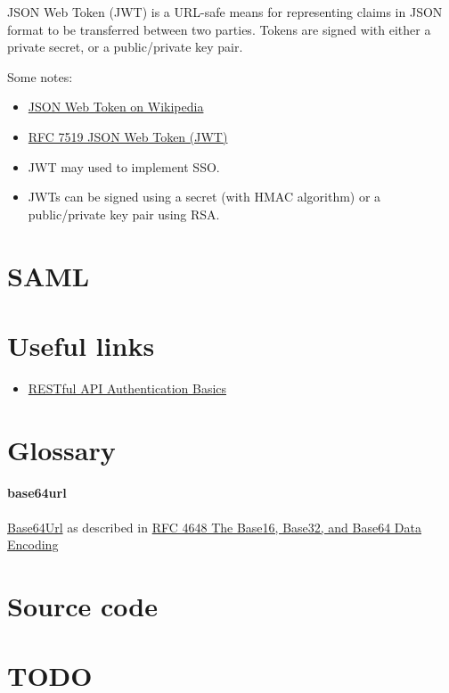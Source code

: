 \documentclass{article}
\begin{document}
JSON Web Token (JWT) is a URL-safe means for representing
claims in JSON format to be transferred between two parties.
Tokens are signed with either a private secret, or a public/private
key pair.

Some notes:

\begin{itemize}
  \item \href{https://en.wikipedia.org/wiki/JSON_Web_Token}{%
     JSON Web Token on Wikipedia}
  \item \href{https://tools.ietf.org/html/rfc7519}{%
     RFC 7519 JSON Web Token (JWT)}
 \item JWT may used to implement SSO.
 \item JWTs can be signed using a secret (with HMAC algorithm) or a
   public/private key pair using RSA.
\end{itemize}


\section{SAML}

\section{Useful links}

\begin{itemize}
  \item \href{https://blog.restcase.com/restful-api-authentication-basics/}{%
      RESTful API Authentication Basics}
\end{itemize}


\appendix

\section{Glossary}

\paragraph{base64url} \href{https://en.wikipedia.org/wiki/Base64#URL_applications}{%
  Base64Url} as described in \href{https://tools.ietf.org/html/rfc4648}{%
    RFC 4648 The Base16, Base32, and Base64 Data Encoding}

\section{Source code}

\section{TODO}
\end{document}
